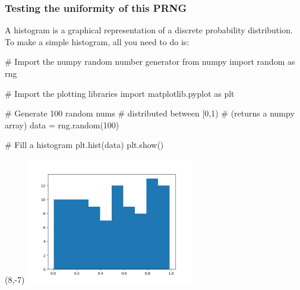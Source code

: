 \documentclass[hyperref={colorlinks=true}]{beamer}
\begin{document}

\begin{frame}[fragile]%
  \frametitle{Testing the uniformity of this PRNG}
  
  A histogram is a graphical representation of a discrete probability distribution. To make a simple histogram, all you need to do is:
  
  \begin{ucpythonblock}{}
# Import the numpy random number generator
from numpy import random as rng

# Import the plotting libraries
import matplotlib.pyplot as plt

# Generate 100 random nums 
# distributed between [0,1)
# (returns a numpy array)
data = rng.random(100) 
 
# Fill a histogram 
plt.hist(data)  
plt.show()
  \end{ucpythonblock}
  
  \pause

  \begin{textblock}{12}(8,-7)
    \includegraphics[width=0.55\textwidth]{RNGHist1.png}
  \end{textblock}  


\end{frame}

\end{document}
